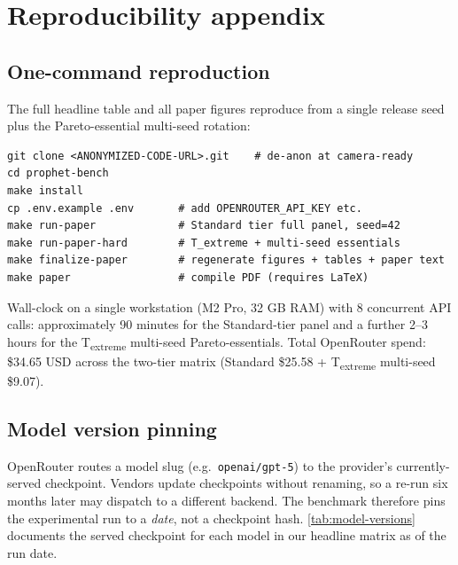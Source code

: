 \appendix
\section{Reproducibility appendix}\label{app:reproduce}

\subsection{One-command reproduction}
The full headline table and all paper figures reproduce from a single
release seed plus the Pareto-essential multi-seed rotation:
\begin{lstlisting}[basicstyle=\small\ttfamily, frame=single]
git clone <ANONYMIZED-CODE-URL>.git    # de-anon at camera-ready
cd prophet-bench
make install
cp .env.example .env       # add OPENROUTER_API_KEY etc.
make run-paper             # Standard tier full panel, seed=42
make run-paper-hard        # T_extreme + multi-seed essentials
make finalize-paper        # regenerate figures + tables + paper text
make paper                 # compile PDF (requires LaTeX)
\end{lstlisting}
Wall-clock on a single workstation (M2 Pro, 32 GB RAM) with 8 concurrent
API calls: approximately 90 minutes for the Standard-tier panel and a
further 2--3 hours for the T\textsubscript{extreme} multi-seed
Pareto-essentials. Total OpenRouter spend: \$34.65 USD across the
two-tier matrix (Standard \$25.58 + T\textsubscript{extreme} multi-seed
\$9.07).

\subsection{Model version pinning}\label{app:model-versions}
OpenRouter routes a model slug (e.g.\ \texttt{openai/gpt-5}) to the
provider's currently-served checkpoint. Vendors update checkpoints
without renaming, so a re-run six months later may dispatch to a
different backend. The benchmark therefore pins the experimental run
to a \emph{date}, not a checkpoint hash. \autoref{tab:model-versions}
documents the served checkpoint for each model in our headline matrix
as of the run date.

